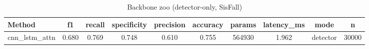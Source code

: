 \begin{table}[t]
\centering
\caption{Backbone zoo (detector-only, SisFall)}
\begin{tabular}{lccccccccc}
\toprule
Method & f1 & recall & specificity & precision & accuracy & params & latency_ms & mode & n \\
\midrule
cnn_lstm_attn & 0.680 & 0.769 & 0.748 & 0.610 & 0.755 & 564930 & 1.962 & detector & 30000 \\
\bottomrule
\end{tabular}
\end{table}